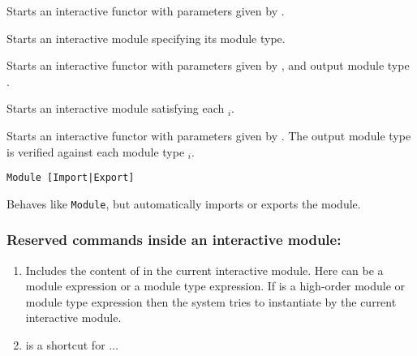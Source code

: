 \begin{Variants}

\item{}

  Starts an interactive functor with parameters given by {\modbindings}.

\item{}

  Starts an interactive module specifying its module type. 

\item{}

  Starts an interactive functor with parameters given by
  {\modbindings}, and output module type {\modtype}.

\item{}

  Starts an interactive module satisfying each {\modtype$_i$}. 

\item{}

  Starts an interactive functor with parameters given by
  {\modbindings}. The output module type is verified against each
  module type {\modtype$_i$}.

\item\texttt{Module [Import|Export]}

  Behaves like \texttt{Module}, but automatically imports or exports
  the module.

\end{Variants}
\subsubsection{Reserved commands inside an interactive module:
}
\begin{enumerate}
\item {}

  Includes the content of {\module} in the current interactive
 module. Here {\module} can be a module expression or a module type
 expression. If {\module} is a high-order module or module type
 expression then the system tries to instantiate {\module}
 by the current interactive module.

\item {}

is a shortcut for {}  $\ldots$ {}
\end{enumerate}
